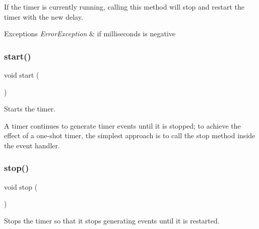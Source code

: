 If the timer is currently running, calling this method will stop and restart the timer with the new delay.


\begin{DoxyExceptions}{Exceptions}
{\em Error\+Exception} & if milliseconds is negative \\
\hline
\end{DoxyExceptions}
\mbox{\label{classGTimer_a60de64d75454385b23995437f1d72669}} 
\subsubsection{\texorpdfstring{start()}{start()}}
{\footnotesize\ttfamily void start (\begin{DoxyParamCaption}{ }\end{DoxyParamCaption})}



Starts the timer. 

A timer continues to generate timer events until it is stopped; to achieve the effect of a one-\/shot timer, the simplest approach is to call the {\ttfamily stop} method inside the event handler. \mbox{\label{classGTimer_a8c528baf37154d347366083f0f816846}} 
\subsubsection{\texorpdfstring{stop()}{stop()}}
{\footnotesize\ttfamily void stop (\begin{DoxyParamCaption}{ }\end{DoxyParamCaption})}



Stops the timer so that it stops generating events until it is restarted. 

